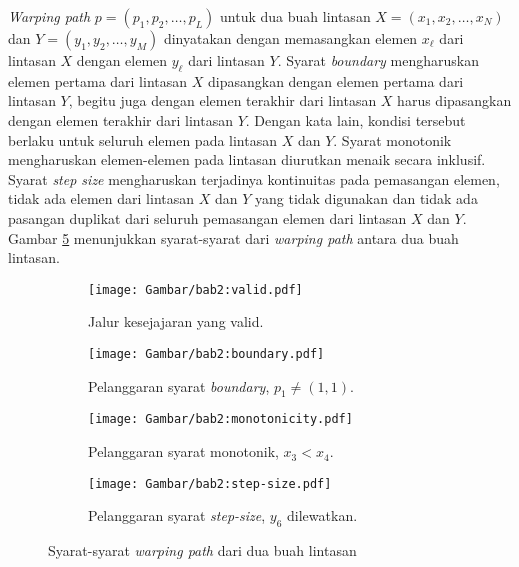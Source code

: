 \textit{Warping path} $p = (p_1, p_2, \ldots, p_L)$ untuk dua buah lintasan $X = (x_1, x_2, \ldots, x_N)$ dan $Y = (y_1, y_2, \ldots, y_M)$ dinyatakan dengan memasangkan elemen $x_\ell$ dari lintasan $X$ dengan elemen $y_\ell$ dari lintasan $Y$. Syarat \textit{boundary} mengharuskan elemen pertama dari lintasan $X$ dipasangkan dengan elemen pertama dari lintasan $Y$, begitu juga dengan elemen terakhir dari lintasan $X$ harus dipasangkan dengan elemen terakhir dari lintasan $Y$. Dengan kata lain, kondisi tersebut berlaku untuk seluruh elemen pada lintasan $X$ dan $Y$. Syarat monotonik mengharuskan elemen-elemen pada lintasan diurutkan menaik secara inklusif. Syarat \textit{step size} mengharuskan terjadinya kontinuitas pada pemasangan elemen, tidak ada elemen dari lintasan $X$ dan $Y$ yang tidak digunakan dan tidak ada pasangan duplikat dari seluruh pemasangan elemen dari lintasan $X$ dan $Y$. Gambar \ref{bab2:dtw-requirements} menunjukkan syarat-syarat dari \textit{warping path} antara dua buah lintasan.

\vspace{10pt}

\begin{figure}[h]
    \centering
    \begin{subfigure}[ht]{0.225\textwidth}
        \centering
        \texttt{[image: Gambar/bab2:valid.pdf]}
        \caption{Jalur kesejajaran yang valid.}
        \label{bab2:valid}
    \end{subfigure}
    \begin{subfigure}[ht]{0.225\textwidth}
        \centering
        \texttt{[image: Gambar/bab2:boundary.pdf]}
        \caption{Pelanggaran syarat \textit{boundary}, $p_1 \neq (1, 1)$.}
        \label{bab2:boundary}
    \end{subfigure}
    \begin{subfigure}[ht]{0.225\textwidth}
        \centering
        \texttt{[image: Gambar/bab2:monotonicity.pdf]}
        \caption{Pelanggaran syarat monotonik, $x_3 < x_4$.}
        \label{bab2:monotonicity}
    \end{subfigure}
    \begin{subfigure}[h]{0.225\textwidth}
        \centering
        \texttt{[image: Gambar/bab2:step-size.pdf]}
        \caption{Pelanggaran syarat \textit{step-size}, $y_6$ dilewatkan.}
        \label{bab2:step-size}
    \end{subfigure}
    \caption[Syarat-syarat \textit{warping path}]{Syarat-syarat \textit{warping path} dari dua buah lintasan}
    \label{bab2:dtw-requirements}
\end{figure}

